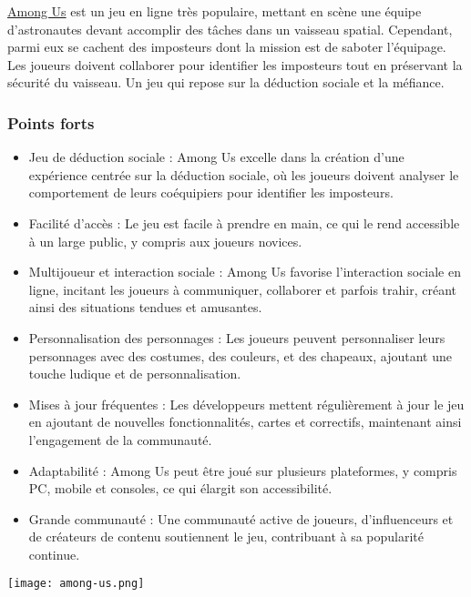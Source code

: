 \documentclass[
	article,			%
	11pt,				%
	oneside,			%
	a4paper,			%
	chapter=TITLE,
	french,			%
	sumario=tradicional
	]{base_nt}
\begin{document}
\begin{exemplo}
    \href{https://fr.wikipedia.org/wiki/Among_Us}{Among Us} est un jeu en ligne très populaire, mettant en scène une équipe d'astronautes devant accomplir des tâches dans un vaisseau spatial. Cependant, parmi eux se cachent des imposteurs dont la mission est de saboter l'équipage. Les joueurs doivent collaborer pour identifier les imposteurs tout en préservant la sécurité du vaisseau. Un jeu qui repose sur la déduction sociale et la méfiance.
\end{exemplo}

\subsubsection{Points forts}

\begin{itemize}
    \item Jeu de déduction sociale : Among Us excelle dans la création d'une expérience centrée sur la déduction sociale, où les joueurs doivent analyser le comportement de leurs coéquipiers pour identifier les imposteurs.
    \item Facilité d'accès : Le jeu est facile à prendre en main, ce qui le rend accessible à un large public, y compris aux joueurs novices.
    \item Multijoueur et interaction sociale : Among Us favorise l'interaction sociale en ligne, incitant les joueurs à communiquer, collaborer et parfois trahir, créant ainsi des situations tendues et amusantes.
    \item Personnalisation des personnages : Les joueurs peuvent personnaliser leurs personnages avec des costumes, des couleurs, et des chapeaux, ajoutant une touche ludique et de personnalisation.
    \item Mises à jour fréquentes : Les développeurs mettent régulièrement à jour le jeu en ajoutant de nouvelles fonctionnalités, cartes et correctifs, maintenant ainsi l'engagement de la communauté.
    \item Adaptabilité : Among Us peut être joué sur plusieurs plateformes, y compris PC, mobile et consoles, ce qui élargit son accessibilité.
    \item Grande communauté : Une communauté active de joueurs, d'influenceurs et de créateurs de contenu soutiennent le jeu, contribuant à sa popularité continue.
\end{itemize}

\vspace{9cm}
\texttt{[image: among-us.png]}
\end{document}
